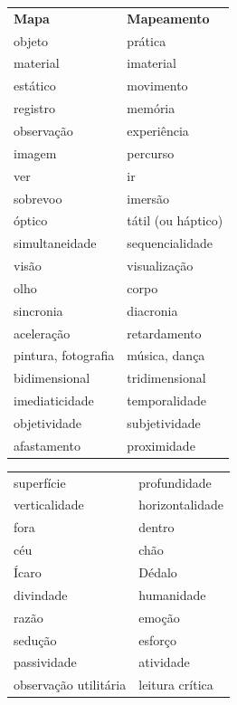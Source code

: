 \begin{table}[!htbp]
\begin{tabular}{ll}
\textbf{Mapa}         & \textbf{Mapeamento} \\
objeto                & prática             \\
material              & imaterial           \\
estático              & movimento           \\
registro              & memória             \\
observação            & experiência         \\
imagem                & percurso            \\
ver                   & ir                  \\
sobrevoo              & imersão             \\
óptico                & tátil (ou háptico)  \\
simultaneidade        & sequencialidade     \\
visão                 & visualização        \\
olho                  & corpo               \\
sincronia             & diacronia           \\
aceleração            & retardamento        \\
pintura, fotografia   & música, dança       \\
bidimensional         & tridimensional      \\
imediaticidade        & temporalidade       \\
objetividade          & subjetividade       \\
afastamento           & proximidade         \\
\end{tabular}
\end{table}

\begin{table}[!htbp]
\begin{tabular}{ll}
superfície            & profundidade        \\
verticalidade         & horizontalidade     \\
fora                  & dentro              \\
céu                   & chão                \\
Ícaro                 & \index{Dedalo@Dédalo}Dédalo              \\
divindade             & humanidade          \\
razão                 & emoção              \\
sedução               & esforço             \\
passividade           & atividade           \\
observação utilitária & leitura crítica    
\end{tabular}
\end{table}

